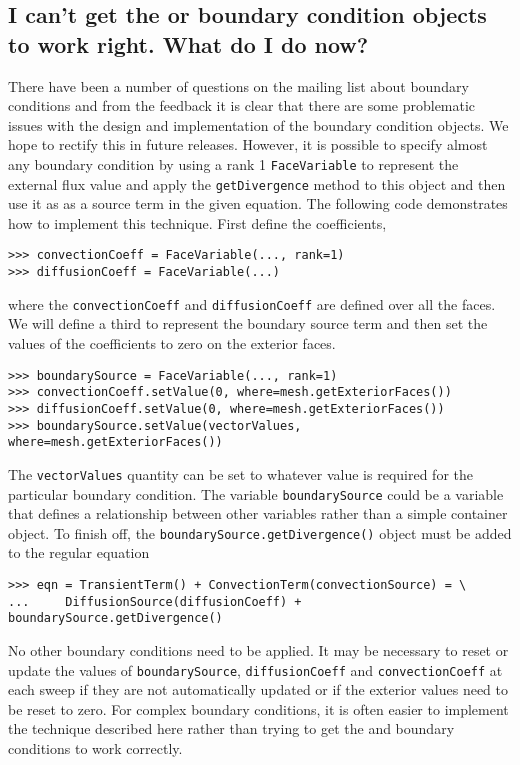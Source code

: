     \subsection{I can't get the  or  boundary
      condition objects to work right. What do I do now?\label{FAQ-anyBoundaryCondition}}

    There have been a number of questions on the mailing list about boundary
    conditions and from the feedback it is clear that there are some problematic
    issues with the design and implementation of the boundary condition objects.
    We hope to rectify this in future releases. However, it is possible to
    specify almost any boundary condition by using a rank 1 \verb+FaceVariable+
    to represent the external flux value and apply the \verb+getDivergence+
    method to this object and then use it as as a source term in the given
    equation. The following code demonstrates how to implement this technique.
    First define the coefficients,
\begin{verbatim}
>>> convectionCoeff = FaceVariable(..., rank=1)
>>> diffusionCoeff = FaceVariable(...)
\end{verbatim}
    where the \verb+convectionCoeff+ and \verb+diffusionCoeff+ are defined over
    all the faces. We will define a third  to represent the
    boundary source term and then set the values of the coefficients to zero on
    the exterior faces.
\begin{verbatim}
>>> boundarySource = FaceVariable(..., rank=1)
>>> convectionCoeff.setValue(0, where=mesh.getExteriorFaces())
>>> diffusionCoeff.setValue(0, where=mesh.getExteriorFaces())
>>> boundarySource.setValue(vectorValues, where=mesh.getExteriorFaces())
\end{verbatim}
    The \verb+vectorValues+ quantity can be set to whatever value is required for
    the particular boundary condition. The variable \verb+boundarySource+ could
    be a variable that defines a relationship between other variables rather than
    a simple container object. To finish off, the \verb+boundarySource.getDivergence()+ object
    must be added to the regular equation
\begin{verbatim}
>>> eqn = TransientTerm() + ConvectionTerm(convectionSource) = \
...     DiffusionSource(diffusionCoeff) + boundarySource.getDivergence()
\end{verbatim}
    No other boundary conditions need to be applied. It may be necessary to reset
    or update the values of \verb+boundarySource+, \verb+diffusionCoeff+ and
    \verb+convectionCoeff+ at each sweep if they are not automatically updated or
    if the exterior values need to be reset to zero. For complex boundary
    conditions, it is often easier to implement the technique described here
    rather than trying to get the \Class{FixedValue} and \Class{FixedFlux}
    boundary conditions to work correctly.

